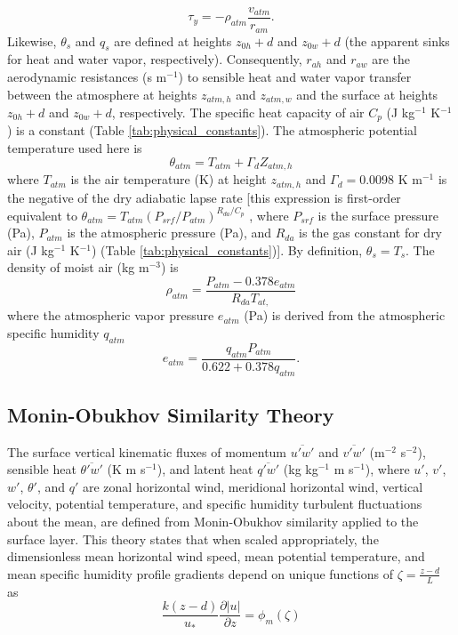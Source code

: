 \documentclass[12pt,authoryear]{elsarticle}
\numberwithin{equation}{section} %
\begin{document}
\begin{equation}
\label{eq:momentum_flux_y}
\tau_{y}=-\rho_{atm}\frac{v_{atm}}{r_{am}}.
\end{equation}
Likewise, $\theta_{s}$ and $q_{s}$ are defined at heights $z_{0h}+d$ and $z_{0w}+d$ (the apparent sinks for heat and water vapor, respectively). Consequently, $r_{ah}$ and $r_{aw}$ are the aerodynamic resistances (s m$^{-1}$) to sensible heat and water vapor transfer between the atmosphere at heights $z_{atm,h}$ and $z_{atm,w}$ and the surface at heights $z_{0h}+d$ and $z_{0w}+d$, respectively. The specific heat capacity of air $C_{p}$ (J kg$^{-1}$ K$^{-1}$) is a constant (Table \ref{tab:physical_constants}). The atmospheric potential temperature used here is
\begin{equation}
\label{eq:atmospheric_potential_temperature}
\theta_{atm}=T_{atm}+\Gamma_{d}Z_{atm,h}
\end{equation}
where $T_{atm}$ is the air temperature (K) at height $z_{atm,h}$ and $\Gamma_{d}=$0.0098 K m$^{-1}$ is the negative of the dry adiabatic lapse rate [this expression is first-order equivalent to $\theta_{atm}=T_{atm}(P_{srf}/P_{atm})^{R_{da}/C_{p}}$ \citep{stullIntroductionBoundaryLayer2012}, where $P_{srf}$ is the surface pressure (Pa), $P_{atm}$ is the atmospheric pressure (Pa), and $R_{da}$ is the gas constant for dry air (J kg$^{-1}$ K$^{-1}$) (Table \ref{tab:physical_constants})]. By definition, $\theta_{s}=T_{s}$. The density of moist air (kg m$^{-3}$) is
\begin{equation}
\rho_{atm}=\frac{P_{atm}-0.378e_{atm}}{R_{da}T_{at,}}
\end{equation}
where the atmospheric vapor pressure $e_{atm}$ (Pa) is derived from the atmospheric specific humidity $q_{atm}$ 
\begin{equation}
e_{atm}=\frac{q_{atm}P_{atm}}{0.622+0.378q_{atm}}.
\end{equation}

\subsection{Monin-Obukhov Similarity Theory}
%
The surface vertical kinematic fluxes of momentum $\overline{u'w'}$ and $\overline{v'w'}$ (m$^{-2}$ s$^{-2}$), sensible heat $\overline{\theta'w'}$ (K m s$^{-1}$), and latent heat $\overline{q'w'}$ (kg kg$^{-1}$ m s$^{-1}$), where $u'$, $v'$, $w'$, $\theta'$, and $q'$ are zonal horizontal wind, meridional horizontal wind, vertical velocity, potential temperature, and specific humidity turbulent fluctuations about the mean, are defined from Monin-Obukhov similarity applied to the surface layer. This theory states that when scaled appropriately, the dimensionless mean horizontal wind speed, mean potential temperature, and mean specific humidity profile gradients depend on unique functions of $\zeta=\frac{z-d}{L}$ \citep{zengIntercomparisonBulkAerodynamic1998} as
\begin{equation}
\frac{k(z-d)}{u_*}\frac{\partial|u|}{\partial z}=\phi_{m}(\zeta)
\end{equation}
\end{document}
